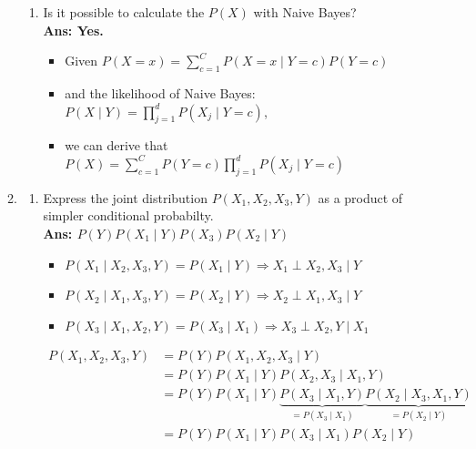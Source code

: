 \documentclass{article}
\theoremstyle{definition}
\theoremstyle{remark}
\begin{document}
\begin{enumerate}[font={\Large\bfseries},left=0pt]
\begin{tcolorbox}
\begin{enumerate}
\begin{enumerate}
				      \item Is it possible to calculate the $P(X)$ with Naive Bayes? \\
				            \textbf{Ans: Yes.} \\
				            \begin{itemize}
					            \item Given $P(X = x) = \sum^C_{c = 1} P(X = x \mid Y = c)P(Y = c) $
					            \item and the likelihood of Naive Bayes: $P(X \mid Y) = \prod^{d}_{j = 1} P(X_j \mid Y = c)$,
					            \item we can derive that $P(X) = \sum^C_{c = 1}P(Y = c) \prod^d_{j = 1} P(X_j \mid Y = c)$
				            \end{itemize}
			      \end{enumerate}


			\item \begin{enumerate}

				      \item Express the joint distribution $P(X_1, X_2, X_3, Y)$ as a product of simpler conditional probabilty. \\
				            \textbf{Ans: $P(Y)P(X_1 \mid Y)P(X_3)P(X_2 \mid Y)$}
				            \begin{itemize}
					            \item $P(X_1 \mid X_2, X_3, Y) = P(X_1 \mid Y) \Rightarrow X_1 \perp X_2, X_3 \mid Y$
					            \item $P(X_2 \mid X_1, X_3, Y) = P(X_2 \mid Y) \Rightarrow X_2 \perp X_1, X_3 \mid Y$
					            \item $P(X_3 \mid X_1, X_2, Y) = P(X_3 \mid X_1) \Rightarrow X_3 \perp X_2, Y \mid X_1$
				            \end{itemize}
				            \begin{align}
					            P(X_1, X_2, X_3, Y) & = P(Y)P(X_1, X_2, X_3 \mid Y)                                                                                                 \\
					                                & = P(Y)P(X_1 \mid Y)P(X_2, X_3 \mid X_1, Y)                                                                                    \\
					                                & = P(Y)P(X_1 \mid Y)\underbrace{P(X_3 \mid X_1, Y)}_{= P(X_3 \mid X_1)}\underbrace{P(X_2 \mid X_3,  X_1, Y)}_{= P(X_2 \mid Y)} \\
					                                & = P(Y)P(X_1 \mid Y)P(X_3 \mid X_1)P(X_2 \mid Y)                                                                               \\
				            \end{align}


\end{enumerate}
\end{enumerate}
\end{tcolorbox}
\end{enumerate}
\end{document}
